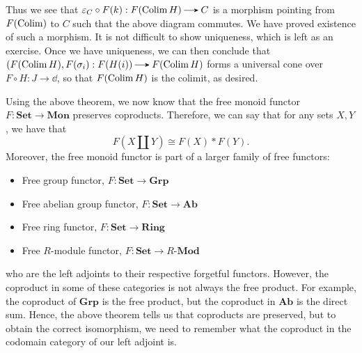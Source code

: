 \begin{prf}
\begin{center}
        \end{center}  
        Thus we see that $\epsilon_C \circ F(k): F(\Colim H) \to C$ is a morphism 
        pointing from $F(\operatorname*{\mathrm{Colim }})$ to $C$ such that the above diagram commutes. 
        We have proved existence of such a morphism. It is not difficult to show 
        uniqueness, which is left as an exercise. 
        Once we have uniqueness, we can then conclude that $(F(\Colim H), F(\sigma_i): F(H(i)) \to F(\Colim H)$ 
        forms a universal cone 
        over $F \circ H: J \to \dd$, so that $F(\operatorname*{\mathrm{Colim }} H)$ is the colimit, as desired. 
    \end{prf}

    \begin{example}
        Using the above theorem, we now know that the free monoid functor 
        $F: \textbf{Set} \to \textbf{Mon}$ preserves coproducts. Therefore, we can say 
        that for any sets $X, Y$, we have that 
        \[
            F(X \amalg Y) \cong F(X) * F(Y).   
        \]
        Moreover, the free monoid functor is part of a larger family of free functors: 
        \begin{itemize}
            \item Free group functor, $F: \textbf{Set} \to \textbf{Grp}$
            \item Free abelian group functor, $F: \textbf{Set} \to \textbf{Ab}$
            \item Free ring functor, $F: \textbf{Set} \to \textbf{Ring}$
            \item Free $R$-module functor, $F: \textbf{Set} \to R\textbf{-Mod}$
        \end{itemize}
        who are the left adjoints to their respective forgetful functors. 
        However, the coproduct in some of these 
        categories is not always the free product. For example, the coproduct of $\textbf{Grp}$ 
        is the free product, but the coproduct in $\textbf{Ab}$ is the direct sum.
        Hence, the above theorem tells us that coproducts are preserved, but to obtain 
        the correct isomorphism, we need to remember what the coproduct in the codomain category 
        of our left adjoint is.
    \end{example}


